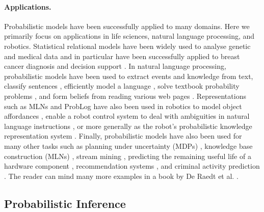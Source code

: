 \documentclass{article}
\begin{document}
\paragraph{Applications.}
Probabilistic models have been successfully applied to many domains. Here we
primarily focus on applications in life sciences, natural language processing,
and robotics. Statistical relational models have been widely used to analyse
genetic \cite{DBLP:journals/nar/MaeyerWRRM15,DBLP:journals/jcb/SakhanenkoG12}
and medical \cite{DBLP:conf/iaai/NatarajanKIJC13} data and in particular have
been successfully applied to breast cancer diagnosis and decision support
\cite{DBLP:conf/ilp/Corte-RealD017,DBLP:conf/pkdd/NassifKBPSC13}. In natural
language processing, probabilistic models have been used to extract events
\cite{DBLP:conf/emnlp/VenugopalCGN14} and knowledge
\cite{DBLP:conf/naacl/PoonV10} from text, classify sentences
\cite{DBLP:conf/emnlp/VerbekeAMFDR12}, efficiently model a language
\cite{DBLP:conf/icml/JerniteRS15}, solve textbook probability problems
\cite{DBLP:conf/ijcai/DriesKDBR17}, and form beliefs from reading various web
pages \cite{DBLP:conf/aaai/CarlsonBKSHM10}. Representations such as MLNs and
ProbLog have also been used in robotics to model object affordances
\cite{DBLP:conf/icra/MoldovanMOSR12,DBLP:conf/iros/MoldovanR14,DBLP:conf/ilp/MoldovanORMS11},
enable a robot control system to deal with ambiguities in natural language
instructions \cite{DBLP:journals/ras/BeetzJMT10}, or more generally as the
robot's probabilistic knowledge representation system
\cite{DBLP:conf/icra/JainMB09}. Finally, probabilistic models have also been
used for many other tasks such as planning under uncertainty (MDPs)
\cite{DBLP:journals/jair/BoutilierDH99}, knowledge base construction (MLNs)
\cite{DBLP:journals/ijswis/NiuZRS12}, stream mining
\cite{DBLP:conf/icdm/ChandraSKTA14}, predicting the remaining useful life of a
hardware component \cite{vlasselaer2012statistical}, recommendation systems
\cite{DBLP:journals/corr/YangKAGN16}, and criminal activity prediction
\cite{DBLP:conf/sdm/DelaneyFCWJ10}. The reader can mind many more examples in a
book by De Raedt et al. \cite{DBLP:series/synthesis/2016Raedt}.

\subsection{Probabilistic Inference}
\end{document}
